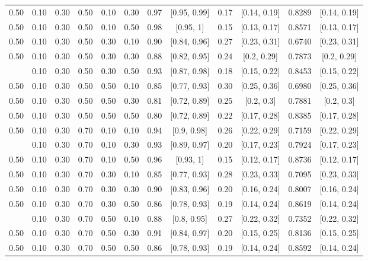 \documentclass[
  11pt,
]{article}
\begin{document}
\begin{landscape}
\begin{ThreePartTable}
\begin{longtable}[t]{cccccccccccc}
0.50 & 0.10 & 0.30 & 0.50 & 0.10 & 0.30 & 0.97 & {}[0.95, 0.99] & 0.17 & {}[0.14, 0.19] & 0.8289 & {}[0.14, 0.19]\\
0.50 & 0.10 & 0.30 & 0.50 & 0.10 & 0.50 & 0.98 & {}[0.95, 1] & 0.15 & {}[0.13, 0.17] & 0.8571 & {}[0.13, 0.17]\\
0.50 & 0.10 & 0.30 & 0.50 & 0.30 & 0.10 & 0.90 & {}[0.84, 0.96] & 0.27 & {}[0.23, 0.31] & 0.6740 & {}[0.23, 0.31]\\
0.50 & 0.10 & 0.30 & 0.50 & 0.30 & 0.30 & 0.88 & {}[0.82, 0.95] & 0.24 & {}[0.2, 0.29] & 0.7873 & {}[0.2, 0.29]\\
\addlinespace
0.50 & 0.10 & 0.30 & 0.50 & 0.30 & 0.50 & 0.93 & {}[0.87, 0.98] & 0.18 & {}[0.15, 0.22] & 0.8453 & {}[0.15, 0.22]\\
0.50 & 0.10 & 0.30 & 0.50 & 0.50 & 0.10 & 0.85 & {}[0.77, 0.93] & 0.30 & {}[0.25, 0.36] & 0.6980 & {}[0.25, 0.36]\\
0.50 & 0.10 & 0.30 & 0.50 & 0.50 & 0.30 & 0.81 & {}[0.72, 0.89] & 0.25 & {}[0.2, 0.3] & 0.7881 & {}[0.2, 0.3]\\
0.50 & 0.10 & 0.30 & 0.50 & 0.50 & 0.50 & 0.80 & {}[0.72, 0.89] & 0.22 & {}[0.17, 0.28] & 0.8385 & {}[0.17, 0.28]\\
0.50 & 0.10 & 0.30 & 0.70 & 0.10 & 0.10 & 0.94 & {}[0.9, 0.98] & 0.26 & {}[0.22, 0.29] & 0.7159 & {}[0.22, 0.29]\\
\addlinespace
0.50 & 0.10 & 0.30 & 0.70 & 0.10 & 0.30 & 0.93 & {}[0.89, 0.97] & 0.20 & {}[0.17, 0.23] & 0.7924 & {}[0.17, 0.23]\\
0.50 & 0.10 & 0.30 & 0.70 & 0.10 & 0.50 & 0.96 & {}[0.93, 1] & 0.15 & {}[0.12, 0.17] & 0.8736 & {}[0.12, 0.17]\\
0.50 & 0.10 & 0.30 & 0.70 & 0.30 & 0.10 & 0.85 & {}[0.77, 0.93] & 0.28 & {}[0.23, 0.33] & 0.7095 & {}[0.23, 0.33]\\
0.50 & 0.10 & 0.30 & 0.70 & 0.30 & 0.30 & 0.90 & {}[0.83, 0.96] & 0.20 & {}[0.16, 0.24] & 0.8007 & {}[0.16, 0.24]\\
0.50 & 0.10 & 0.30 & 0.70 & 0.30 & 0.50 & 0.86 & {}[0.78, 0.93] & 0.19 & {}[0.14, 0.24] & 0.8619 & {}[0.14, 0.24]\\
\addlinespace
0.50 & 0.10 & 0.30 & 0.70 & 0.50 & 0.10 & 0.88 & {}[0.8, 0.95] & 0.27 & {}[0.22, 0.32] & 0.7352 & {}[0.22, 0.32]\\
0.50 & 0.10 & 0.30 & 0.70 & 0.50 & 0.30 & 0.91 & {}[0.84, 0.97] & 0.20 & {}[0.15, 0.25] & 0.8136 & {}[0.15, 0.25]\\
0.50 & 0.10 & 0.30 & 0.70 & 0.50 & 0.50 & 0.86 & {}[0.78, 0.93] & 0.19 & {}[0.14, 0.24] & 0.8592 & {}[0.14, 0.24]\\

\end{longtable}
\end{ThreePartTable}
\end{landscape}
\end{document}
